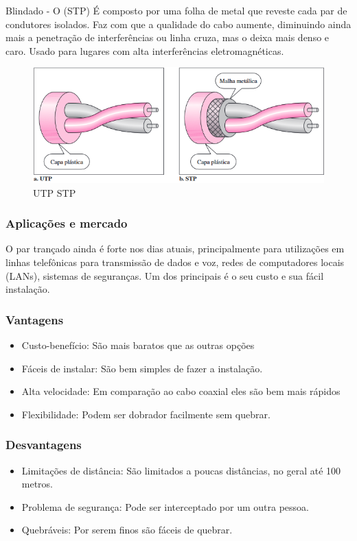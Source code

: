 \documentclass[12pt,a4, oneside, brazil]{article}
\begin{document}
	Blindado - O (STP) É composto por uma folha de metal que reveste cada par de condutores isolados. Faz com que a qualidade do cabo aumente, diminuindo ainda mais a penetração de interferências ou linha cruza, mas o deixa mais denso e caro. Usado para lugares com alta interferências eletromagnéticas.
	
	\begin{figure}[H]
		\centering
		\includegraphics[width=15cm]{utpStp}
		\caption{UTP STP}
		\label{fig:utpstp}
	\end{figure}
	
	
	\subsubsection{Aplicações e mercado}
	O par trançado ainda é forte nos dias atuais, principalmente para utilizações em linhas telefônicas para transmissão de dados e voz, redes de computadores locais (LANs), sistemas de seguranças. Um dos principais é o seu custo e sua fácil instalação.
	
	\subsubsection{Vantagens}
	\begin{itemize}
		\item Custo-benefício: São mais baratos que as outras opções
		\item Fáceis de instalar: São bem simples de fazer a instalação.
		\item Alta velocidade: Em comparação ao cabo coaxial eles são bem mais rápidos
		\item Flexibilidade: Podem ser dobrador facilmente sem quebrar.
	\end{itemize}
	
	\subsubsection{Desvantagens}
	\begin{itemize}
		\item Limitações de distância: São limitados a poucas distâncias, no geral até 100 metros.
		\item Problema de segurança: Pode ser interceptado por um outra pessoa.
		\item Quebráveis: Por serem finos são fáceis de quebrar.
	\end{itemize}
\end{document}
